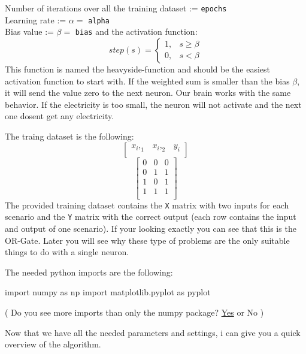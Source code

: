 \documentclass[
]{book}
\newenvironment{Shaded}{\begin{snugshade}}{\end{snugshade}}
\newcommand{\ImportTok}[1]{#1}
\newcommand{\NormalTok}[1]{#1}
\begin{document}
Number of iterations over all the training dataset := \texttt{epochs}\\
Learning rate := \(\alpha =\) \texttt{alpha}\\
Bias value := \(\beta =\) \texttt{bias}
and the activation function:\\
\[ 
step(s)= 
\begin{cases}
    1,& s   \geq \beta\\
    0,& s < \beta
\end{cases}
\]
This function is named the heavyside-function and should be the easiest activation function to start with. If the weighted sum is smaller than the bias \(\beta\), it will send the value zero to the next neuron. Our brain works with the same behavior. If the electricity is too small, the neuron will not activate and the next one dosent get any electricity.

The traing dataset is the following:
\[
\left[
\begin{array}{cc|c}
x_i,_1 & x_i,_2 & y_i \\
\end{array}
\right]
\]
\[
\left[
\begin{array}{cc|c}
0 & 0 & 0 \\
0 & 1 & 1 \\
1 & 0 & 1 \\
1 & 1 & 1 \\
\end{array}
\right]
\]
The provided training dataset contains the \texttt{X} matrix with two inputs for each scenario and the \texttt{Y} matrix with the correct output (each row contains the input and output of one scenario). If your looking exactly you can see that this is the OR-Gate. Later you will see why these type of problems are the only suitable things to do with a single neuron.

The needed python imports are the following:

\begin{Shaded}
\begin{Highlighting}[]
\ImportTok{import}\NormalTok{ numpy }\ImportTok{as}\NormalTok{ np}
\ImportTok{import}\NormalTok{ matplotlib.pyplot }\ImportTok{as}\NormalTok{ pyplot}
\end{Highlighting}
\end{Shaded}

( Do you see more imports than only the numpy package? \href{https://www.youtube.com/watch?v=dQw4w9WgXcQ}{Yes} or No )

Now that we have all the needed parameters and settings, i can give you a quick overview of the algorithm.
\end{document}
